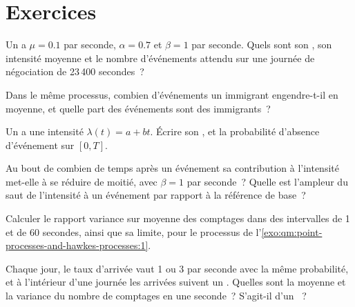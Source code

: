 \section{Exercices}

\begin{exercise}[$\star$]\label{exo:qm:point-processes-and-hawkes-processes:1}
Un  a $\mu = 0.1$ par seconde, $\alpha = 0.7$ et $\beta = 1$ par seconde. Quels sont son , son intensité moyenne
et le nombre d'événements attendu sur une journée de négociation de 23\,400 secondes~?
\end{exercise}

\begin{exercise}[$\star$]\label{exo:qm:point-processes-and-hawkes-processes:2}
Dans le même processus, combien d'événements un immigrant engendre-t-il en moyenne, et quelle part des événements sont
des immigrants~?
\end{exercise}

\begin{exercise}[$\star$]\label{exo:qm:point-processes-and-hawkes-processes:3}
Un  a une intensité $\lambda(t) = a + bt$. Écrire son , et la probabilité
d'absence d'événement sur $[0, T]$.
\end{exercise}

\begin{exercise}[$\star\star$]\label{exo:qm:point-processes-and-hawkes-processes:4}
Au bout de combien de temps après un événement sa contribution à l'intensité met-elle à se réduire de moitié, avec $\beta = 1$ par seconde~? Quelle est
l'ampleur du saut de l'intensité à un événement par rapport à la référence de base~?
\end{exercise}

\begin{exercise}[$\star\star$]\label{exo:qm:point-processes-and-hawkes-processes:5}
Calculer le rapport variance sur moyenne des comptages dans des intervalles de 1 et de 60 secondes, ainsi que sa limite, pour le processus de
l'\cref{exo:qm:point-processes-and-hawkes-processes:1}.
\end{exercise}

\begin{exercise}[$\star\star$]\label{exo:qm:point-processes-and-hawkes-processes:6}
Chaque jour, le taux d'arrivée vaut 1 ou 3 par seconde avec la même probabilité, et à l'intérieur d'une journée les arrivées suivent un .
Quelles sont la moyenne et la variance du nombre de comptages en une seconde~? S'agit-il d'un ~?
\end{exercise}

